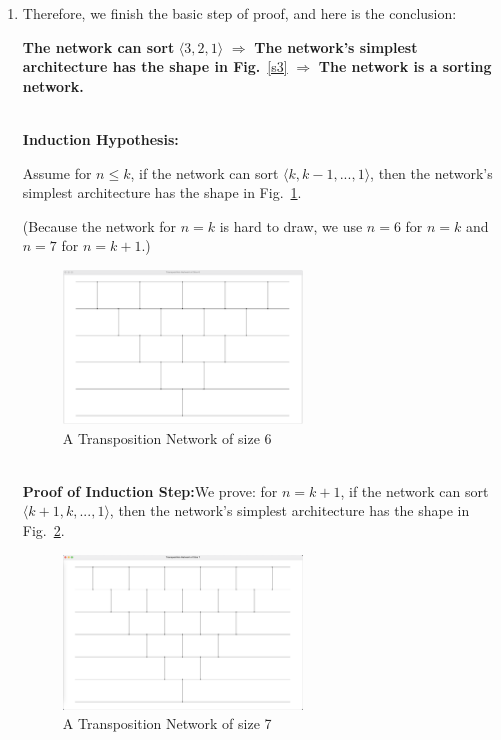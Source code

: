 \documentclass[12pt,a4paper]{article}
\makeatletter
\newtheorem*{solution}{Solution}
\theoremstyle{definition}
\renewenvironment{solution}[1][Solution] {\par\pushQED{\qed}\normalfont\topsep6\p@\@plus6\p@\relax\trivlist\item[\hskip\labelsep\bfseries#1\@addpunct{.}]\ignorespaces}{\popQED\endtrivlist\@endpefalse} \makeatother
\makeatother
\begin{document}
\begin{enumerate}
\begin{solution}
\begin{enumerate}
Therefore, we finish the basic step of proof, and here is the conclusion:

\textbf{The network can sort} $\langle 3, 2, 1 \rangle$ $\Rightarrow$ \textbf{The network's simplest architecture has the shape in Fig.}~\ref{s3} $\Rightarrow$ \textbf{The network is a sorting network.}

~\\
\textbf{Induction Hypothesis:}

Assume for $n\leq k$, if the network can sort $\langle k, k-1, ..., 1\rangle$, then the network's simplest architecture has the shape in Fig.~\ref{s6}.

(Because the network for $n=k$ is hard to draw, we use $n=6$ for $n=k$ and $n=7$ for $n=k+1$.)

\begin{figure}[htbp]
    \centering
    \includegraphics[width=0.6\textwidth]{size6.png}
    \caption{A Transposition Network of size 6}\label{s6}
\end{figure}

~\\
\textbf{Proof of Induction Step:}We prove: for $n=k+1$, if the network can sort $\langle k+1, k, ..., 1\rangle$, then the network's simplest architecture has the shape in Fig.~\ref{s7}.


\begin{figure}[htbp]
    \centering
    \includegraphics[width=0.6\textwidth]{size7.png}
    \caption{A Transposition Network of size 7}\label{s7}
\end{figure}



\end{enumerate}
\end{solution}
\end{enumerate}
\end{document}
